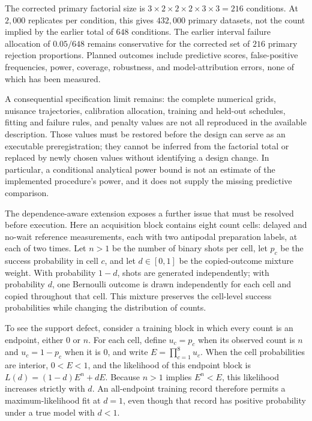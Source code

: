 \documentclass[11pt]{article}
\begin{document}
The corrected primary factorial size is $3\times2\times2\times2\times3\times3=216$ conditions. At $2{,}000$ replicates per condition, this gives $432{,}000$ primary datasets, not the count implied by the earlier total of $648$ conditions. The earlier interval failure allocation of $0.05/648$ remains conservative for the corrected set of $216$ primary rejection proportions. Planned outcomes include predictive scores, false-positive frequencies, power, coverage, robustness, and model-attribution errors, none of which has been measured.

A consequential specification limit remains: the complete numerical grids, nuisance trajectories, calibration allocation, training and held-out schedules, fitting and failure rules, and penalty values are not all reproduced in the available description. Those values must be restored before the design can serve as an executable preregistration; they cannot be inferred from the factorial total or replaced by newly chosen values without identifying a design change. In particular, a conditional analytical power bound is not an estimate of the implemented procedure\textquoteright{}s power, and it does not supply the missing predictive comparison.

The dependence-aware extension exposes a further issue that must be resolved before execution. Here an acquisition block contains eight count cells: delayed and no-wait reference measurements, each with two antipodal preparation labels, at each of two times. Let $n>1$ be the number of binary shots per cell, let $p_c$ be the success probability in cell $c$, and let $d\in[0,1]$ be the copied-outcome mixture weight. With probability $1-d$, shots are generated independently; with probability $d$, one Bernoulli outcome is drawn independently for each cell and copied throughout that cell. This mixture preserves the cell-level success probabilities while changing the distribution of counts.

To see the support defect, consider a training block in which every count is an endpoint, either $0$ or $n$. For each cell, define $u_c=p_c$ when its observed count is $n$ and $u_c=1-p_c$ when it is $0$, and write $E=\prod_{c=1}^{8}u_c$. When the cell probabilities are interior, $0<E<1$, and the likelihood of this endpoint block is $L(d)=(1-d)E^n+dE$. Because $n>1$ implies $E^n<E$, this likelihood increases strictly with $d$. An all-endpoint training record therefore permits a maximum-likelihood fit at $d=1$, even though that record has positive probability under a true model with $d<1$.
\end{document}
